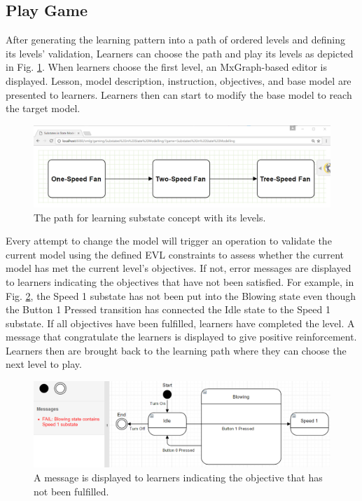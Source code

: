 \documentclass[conference]{IEEEtran}
\begin{document}
\subsection{Play Game}
After generating the learning pattern into a path of ordered levels and defining its levels' validation, Learners can choose the path and play its levels as depicted in Fig. \ref{path}. When learners choose the first level, an MxGraph-based editor is displayed. Lesson, model description, instruction, objectives, and base model are presented to learners. Learners then can start to modify the base model to reach the target model. 

\begin{figure}[th]
\centering
\includegraphics[width=\linewidth]{path}
\caption{The path for learning substate concept with its levels.}
\label{path}
\end{figure}    

Every attempt to change the model will trigger an operation to validate the current model using the defined EVL constraints to assess whether the current model has met the current level's objectives. If not, error messages are displayed to learners indicating the objectives that have not been satisfied. For example, in Fig. \ref{example-fail-messages}, the Speed 1 substate has not been put into the Blowing state even though the Button 1 Pressed transition has connected the Idle state to the Speed 1 substate. If all objectives have been fulfilled, learners have completed the level. A message that congratulate the learners is displayed to give positive reinforcement. Learners then are brought back to the learning path where they can choose the next level to play.  

\begin{figure}[th]
\centering
\includegraphics[width=\linewidth]{example-fail-messages}
\caption{A message is displayed to learners indicating the objective that has not been fulfilled.}
\label{example-fail-messages}
\end{figure}  
\end{document}
